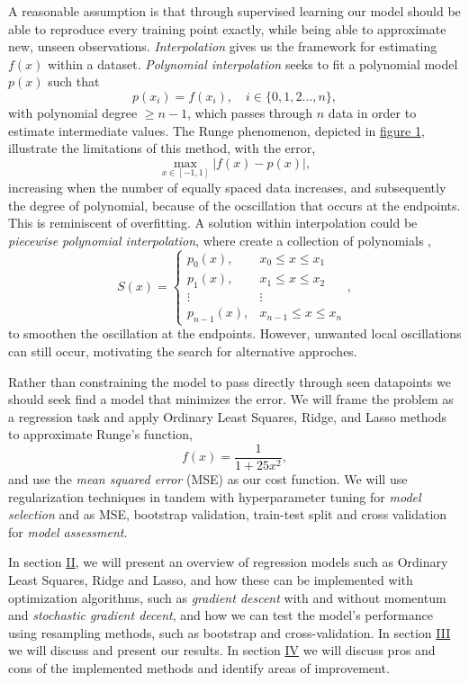 \documentclass[amssymb,twocolumn,aps]{revtex4}
\begin{document}
A reasonable assumption is that through supervised learning our model should be able to reproduce every training point exactly, while being able to approximate new, unseen observations. \textit{Interpolation} gives us the framework for estimating $f(x)$ within a dataset. \textit{Polynomial interpolation} seeks to fit a polynomial model $p(x)$ such that $$p(x_i) = f(x_i),\quad i\in \{0,1, 2\dots,  n\},$$ with polynomial degree $\geq n-1$, which passes through $n$ data in order to estimate intermediate values\cite{johau1}. The Runge phenomenon, depicted in \hyperref[fig:biasvariance]{figure 1}, illustrate the limitations of this method, with the error, $$\max_{x \in [-1,1]} \lvert f(x) - p(x) \rvert, $$ increasing when the number of equally spaced data increases, and subsequently the degree of polynomial, because of the ocscillation that occurs at the endpoints. This is reminiscent of overfitting. A solution within interpolation could be \textit{piecewise polynomial interpolation}, where create a collection of polynomials \cite{johau2},
\begin{equation*}
S(x)=
\begin{cases}
p_0(x), & x_0 \le x \le x_1 \\
p_1(x), & x_1 \le x \le x_2 \\
\vdots & \vdots \\
p_{n-1}(x), & x_{n-1} \le x \le x_n
\end{cases},
\end{equation*}
to smoothen the oscillation at the endpoints. However, unwanted local oscillations can still occur, motivating the search for alternative approches.

Rather than constraining the model to pass directly through seen datapoints we should seek find a model that minimizes the error. We will frame the problem as a regression task and apply Ordinary Least Squares, Ridge, and Lasso methods to approximate Runge's function, $$ f(x) = \frac{1}{1+25x^2},$$ and use the \textit{mean squared error} (MSE) as our cost function. We will use regularization techniques in tandem with hyperparameter tuning for \textit{model selection} and as MSE, bootstrap validation, train-test split and cross validation for \textit{model assessment}\cite{fysml1}.

In section \hyperref[section:methods]{II}, we will present an overview of regression models such as Ordinary Least Squares, Ridge and Lasso, and how these can be implemented with optimization algorithms, such as \textit{gradient descent} with and without momentum and \textit{stochastic gradient decent}, and how we can test the model's performance using resampling methods, such as bootstrap and cross-validation. 
In section \hyperref[section:results]{III} we will discuss and present our results.
In section \hyperref[section:conclusion]{IV} we will discuss pros and cons of the implemented methods and identify areas of improvement.
\end{document}

